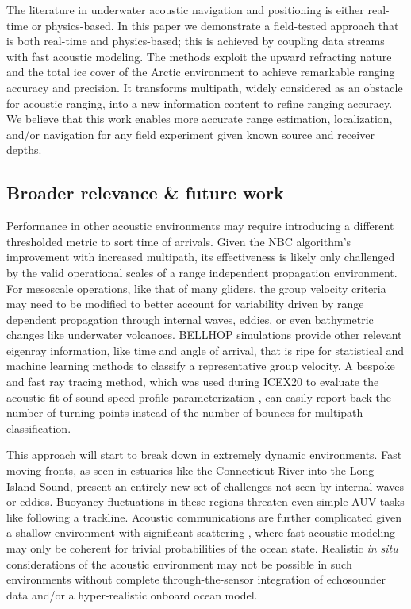 The literature in underwater acoustic navigation and positioning is either real-time or physics-based.
In this paper we demonstrate a field-tested approach that is both real-time and physics-based; this is achieved by coupling data streams with fast acoustic modeling.
The methods exploit the upward refracting nature and the total ice cover of the Arctic environment to achieve remarkable ranging accuracy and precision.
It transforms multipath, widely considered as an obstacle for acoustic ranging, into a new information content to refine ranging accuracy.
We believe that this work enables more accurate range estimation, localization, and/or navigation for any field experiment given known source and receiver depths.

\subsection{Broader relevance \& future work}

Performance in other acoustic environments may require introducing a different thresholded metric to sort time of arrivals.
Given the NBC algorithm's improvement with increased multipath, its effectiveness is likely only challenged by the valid operational scales of a range independent propagation environment.
For mesoscale operations, like that of many gliders, the group velocity criteria may need to be modified to better account for variability driven by range dependent propagation through internal waves, eddies, or even bathymetric changes like underwater volcanoes.
BELLHOP simulations provide other relevant eigenray information, like time and angle of arrival, that is ripe for statistical and machine learning methods to classify a representative group velocity.
A bespoke and fast ray tracing method, which was used during ICEX20 to evaluate the acoustic fit of sound speed profile parameterization \citep{bhatt_embedded_2021}, can easily report back the number of turning points instead of the number of bounces for multipath classification.

This approach will start to break down in extremely dynamic environments.
Fast moving fronts, as seen in estuaries like the Connecticut River into the Long Island Sound, present an entirely new set of challenges not seen by internal waves or eddies.
Buoyancy fluctuations in these regions threaten even simple AUV tasks like following a trackline.
Acoustic communications are further complicated given a shallow environment with significant scattering \citep{lavery_measurements_2010,ross_acoustic_2012,lavery_broadband_2013}, where fast acoustic modeling may only be coherent for trivial probabilities of the ocean state.
Realistic \textit{in situ} considerations of the acoustic environment may not be possible in such environments without complete through-the-sensor integration of echosounder data and/or a hyper-realistic onboard ocean model.

